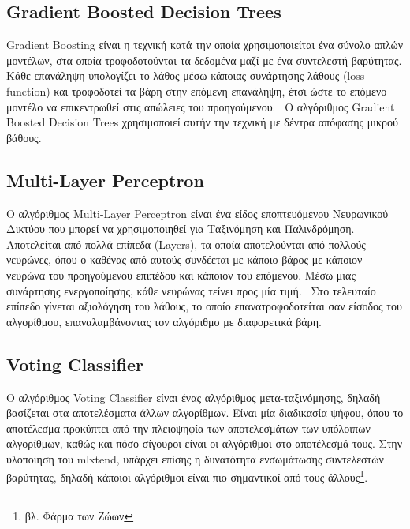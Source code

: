 \documentclass[a4paper, 12pt]{article}
\begin{document}
\subsection{Gradient Boosted Decision Trees}
Gradient Boosting είναι η τεχνική κατά την οποία χρησιμοποιείται ένα σύνολο απλών μοντέλων, στα οποία τροφοδοτούνται τα δεδομένα μαζί με ένα συντελεστή βαρύτητας. Κάθε επανάληψη υπολογίζει το λάθος μέσω κάποιας συνάρτησης λάθους (loss function) και τροφοδοτεί τα βάρη στην επόμενη επανάληψη, έτσι ώστε το επόμενο μοντέλο να επικεντρωθεί στις απώλειες του προηγούμενου.~\cite{friedman-2001} Ο αλγόριθμος Gradient Boosted Decision Trees χρησιμοποιεί αυτήν την τεχνική με δέντρα απόφασης μικρού βάθους.~\cite{sklearn-gbdt}

\subsection{Multi-Layer Perceptron}
Ο αλγόριθμος Multi-Layer Perceptron είναι ένα είδος εποπτευόμενου Νευρωνικού Δικτύου που μπορεί να χρησιμοποιηθεί για Ταξινόμηση και Παλινδρόμηση. Αποτελείται από πολλά επίπεδα (Layers), τα οποία αποτελούνται από πολλούς νευρώνες, όπου ο καθένας από αυτούς συνδέεται με κάποιο βάρος με κάποιον νευρώνα του προηγούμενου επιπέδου και κάποιον του επόμενου. Μέσω μιας συνάρτησης ενεργοποίησης, κάθε νευρώνας τείνει προς μία τιμή.~\cite{rosenbaltt-1957} Στο τελευταίο επίπεδο γίνεται αξιολόγηση του λάθους, το οποίο επανατροφοδοτείται σαν είσοδος του αλγορίθμου, επαναλαμβάνοντας τον αλγόριθμο με διαφορετικά βάρη.~\cite{sklearn-mlp} 

\subsection{Voting Classifier}
Ο αλγόριθμος Voting Classifier είναι ένας αλγόριθμος μετα-ταξινόμησης, δηλαδή βασίζεται στα αποτελέσματα άλλων αλγορίθμων. Είναι μία διαδικασία ψήφου, όπου το αποτέλεσμα προκύπτει από την πλειοψηφία των αποτελεσμάτων των υπόλοιπων αλγορίθμων, καθώς και πόσο σίγουροι είναι οι αλγόριθμοι στο αποτέλεσμά τους. Στην υλοποίηση του mlxtend, υπάρχει επίσης η δυνατότητα ενσωμάτωσης συντελεστών βαρύτητας, δηλαδή κάποιοι αλγόριθμοι είναι πιο σημαντικοί από τους άλλους\footnote{βλ. Φάρμα των Ζώων}.~\cite{mlxtend-vc}
\end{document}
